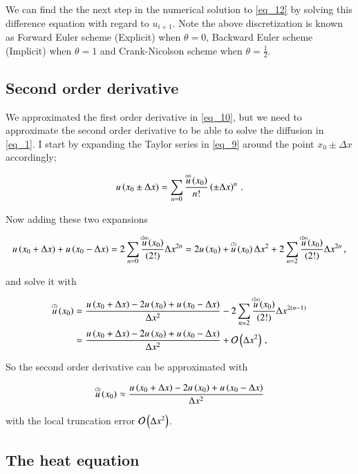 \documentclass[11pt,english,a4paper]{article}
\begin{document}
\begin{flushleft}
We can find the the next step in the numerical solution to \eqref{eq_12} by solving this difference equation with regard to $u_{i+1}$. Note the above discretization is known as Forward Euler scheme (Explicit) when $\theta = 0$, Backward Euler scheme (Implicit) when $\theta = 1$ and Crank-Nicolson scheme when $\theta = \frac{1}{2}$.

\subsection{Second order derivative}

We approximated the first order derivative in \eqref{eq_10}, but we need to approximate the second order derivative to be able to solve the diffusion in \eqref{eq_1}. I start by expanding the Taylor series in \eqref{eq_9} around the point $x_0\pm\Delta x$ accordingly;

\begin{align}
u\p{x_0\pm\Delta x} = \sum_{n=0} \frac{\T{u}{(n)}\p{x_0}}{n!}\p{\pm\Delta x}^n\,.
\label{eq_14}
\end{align}

Now adding these two expansions

\begin{align*}
u\p{x_0+\Delta x} + u\p{x_0-\Delta x} = 2\sum_{n=0} \frac{\T{u}{(2n)}\p{x_0}}{(2!)}\Delta x^{2n} = 2 u\p{x_0} + \T{u}{(2)}\p{x_0}\Delta x^2 + 2\sum_{n=2} \frac{\T{u}{(2n)}\p{x_0}}{(2!)}\Delta x^{2n}\,,
\end{align*}

and solve it with

\begin{align*}
\T{u}{(2)}\p{x_0} &= \frac{u\p{x_0+\Delta x} - 2 u\p{x_0} + u\p{x_0-\Delta x}}{\Delta x^2} - 2\sum_{n=2} \frac{\T{u}{(2n)}\p{x_0}}{(2!)}\Delta x^{2(n-1)}
\\ &=  \frac{u\p{x_0+\Delta x} - 2 u\p{x_0} + u\p{x_0-\Delta x}}{\Delta x^2} + \mathcal{O}\p{\Delta x^2}\,,
\end{align*}

So the second order derivative can be approximated with

\begin{align}
\T{u}{(2)}\p{x_0} \approx   \frac{u\p{x_0+\Delta x} - 2 u\p{x_0} + u\p{x_0-\Delta x}}{\Delta x^2}
\label{eq_15}
\end{align}

with the local truncation error $\mathcal{O}\p{\Delta x^2}$.

\subsection{The heat equation} \label{heat_equation}


\end{flushleft}
\end{document}
